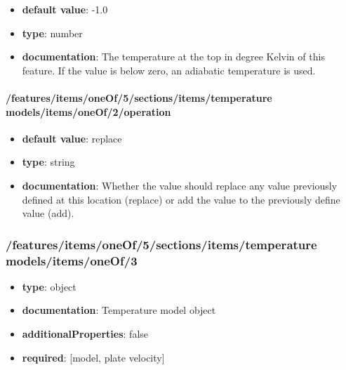 \begin{itemize}\item {\bf default value}: -1.0
\item {\bf type}: number
\item {\bf documentation}: The temperature at the top in degree Kelvin of this feature. If the value is below zero, an adiabatic temperature is used.
\end{itemize}\paragraph{/features/items/oneOf/5/sections/items/temperature models/items/oneOf/2/operation}
\begin{itemize}\item {\bf default value}: replace
\item {\bf type}: string
\item {\bf documentation}: Whether the value should replace any value previously defined at this location (replace) or add the value to the previously define value (add).
\end{itemize}\subsubsection{/features/items/oneOf/5/sections/items/temperature models/items/oneOf/3}
\begin{itemize}\item {\bf type}: object
\item {\bf documentation}: Temperature model object
\item {\bf additionalProperties}: false
\item {\bf required}: [model, plate velocity]\end{itemize}
